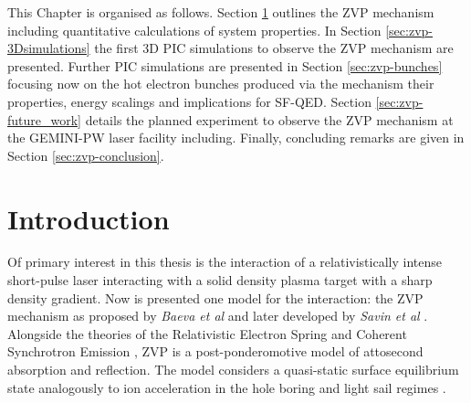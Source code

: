This Chapter is organised as follows. Section \ref{sec:zvp-intro} outlines the \ac{ZVP} mechanism including quantitative calculations of system properties. In Section \ref{sec:zvp-3Dsimulations} the first 3D PIC simulations to observe the ZVP mechanism are presented. Further PIC simulations are presented in Section \ref{sec:zvp-bunches} focusing now on the hot electron bunches produced via the mechanism their properties, energy scalings and implications for \ac{SF-QED}. Section \ref{sec:zvp-future_work} details the planned experiment to observe the ZVP mechanism at the GEMINI-PW laser facility including. Finally, concluding remarks are given in Section \ref{sec:zvp-conclusion}.

\section{Introduction}\label{sec:zvp-intro}
Of primary interest in this thesis is the interaction of a relativistically intense short-pulse laser interacting with a solid density plasma target with a sharp density gradient. Now is presented one model for the interaction: the \ac{ZVP} mechanism as proposed by \textit{Baeva et al} \cite{baevaZeroVectorPotential2011} and later developed by \textit{Savin et al} \cite{savinAttosecondscaleAbsorptionExtreme2017,savinModellingLaserPlasmaInteractions2019}. Alongside the theories of the Relativistic Electron Spring \cite{gonoskovUltrarelativisticNanoplasmonicsRoute2011, gonoskovUltrarelativisticNanoplasmonicsRoute2011} and Coherent Synchrotron Emission \cite{derbruggeEnhancedRelativisticHarmonics2010}, \ac{ZVP} is a post-ponderomotive model of attosecond absorption and reflection. The model considers a quasi-static surface equilibrium state analogously to ion acceleration in the hole boring \cite{vincentiOpticalPropertiesRelativistic2014} and light sail regimes \cite{macchiTheoryLightSail2014}.


